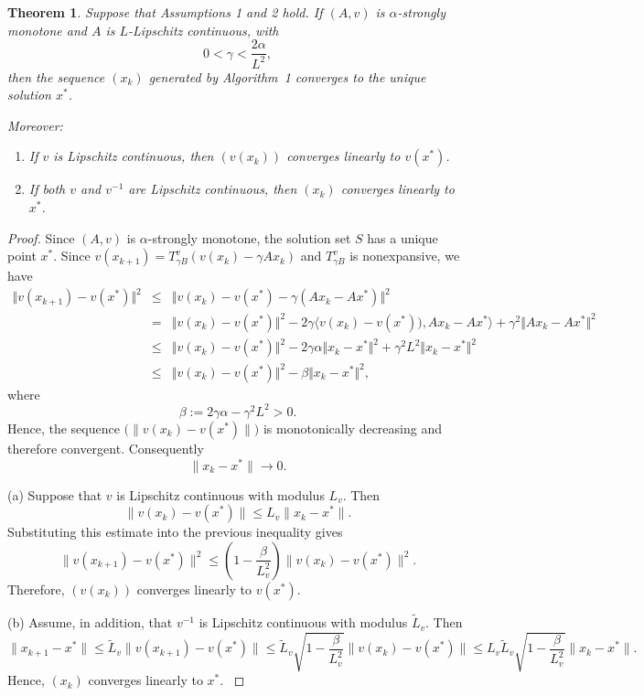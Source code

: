 \documentclass[10pt,a4paper]{amsart}
\def\baqn{\begin{eqnarray*}}
\def\eaqn{\end{eqnarray*}}
\theoremstyle{plain}
\newtheorem{theorem}{Theorem}[section]
\theoremstyle{definition}
\begin{document}
\begin{theorem}\label{thm1} 
Suppose that Assumptions 1 and 2 hold. If $(A,v)$ is $\alpha$-strongly monotone and $A$ is $L$-Lipschitz continuous, with
\[
0<\gamma<\frac{2\alpha}{L^2},
\]
then the sequence $(x_k)$ generated by Algorithm~1 converges to the unique solution $x^*$.

Moreover:
\begin{enumerate}
\item[(a)] If $v$ is Lipschitz continuous, then $(v(x_k))$ converges linearly to $v(x^*)$.
\item[(b)] If both $v$ and $v^{-1}$ are Lipschitz continuous, then $(x_k)$ converges linearly to $x^*$.
\end{enumerate}
\end{theorem}

\begin{proof}
Since $(A,v)$ is $\alpha$-strongly monotone, the solution set $S$ has a unique point $x^*$.
{Since $v(x_{k+1})=T_{\gamma B}^v(v(x_k)-\gamma Ax_k)$ and $T_{\gamma B}^v$ is nonexpansive, we have
\baqn
\Vert v(x_{k+1})-v(x^*)\Vert^2&\le&\Vert v(x_{k})-v(x^*)-\gamma (Ax_k-Ax^*)\Vert^2\\
&=&\Vert v(x_{k})-v(x^*)\Vert^2-2\gamma\langle v(x_{k})-v(x^*)), Ax_k-Ax^*\rangle+\gamma^2 \Vert Ax_k-Ax^*\Vert^2\\
&\le&\Vert v(x_{k})-v(x^*)\Vert^2-2\gamma \alpha \Vert x_{k}-x^*\Vert^2+\gamma^2L^2\Vert x_{k}-x^*\Vert^2\\
&\le&\Vert v(x_{k})-v(x^*)\Vert^2-\beta \Vert x_{k}-x^*\Vert^2,
\eaqn
where
\[
\beta:=2\gamma\alpha-\gamma^2L^2>0.
\]
Hence, the sequence $\bigl(\|v(x_k)-v(x^*)\|\bigr)$ is monotonically decreasing and therefore convergent.  Consequently $$\|x_k-x^*\|\to0.$$
}

\noindent
 {
(a) Suppose that $v$ is Lipschitz continuous with modulus $L_v$. Then
\[
\|v(x_k)-v(x^*)\|
\le
L_v\|x_k-x^*\|.
\]
Substituting this estimate into the previous inequality gives
\[
\|v(x_{k+1})-v(x^*)\|^2
\le
\left(1-\frac{\beta}{L_v^2}\right)
\|v(x_k)-v(x^*)\|^2.
\]
Therefore, $(v(x_k))$ converges linearly to $v(x^*)$.
}
\medskip

\noindent
{(b) Assume, in addition, that $v^{-1}$ is Lipschitz continuous with modulus $\widetilde L_v$. Then
\[
\|x_{k+1}-x^*\|
\le
\widetilde L_v\|v(x_{k+1})-v(x^*)\|
\le
\widetilde L_v
\sqrt{1-\frac{\beta}{L_v^2}}
\|v(x_k)-v(x^*)\|
\le
L_v\widetilde L_v
\sqrt{1-\frac{\beta}{L_v^2}}
\|x_k-x^*\|.
\]
Hence, $(x_k)$ converges linearly to $x^*$.
}
\end{proof}
\end{document}
